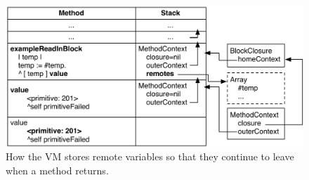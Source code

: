 \documentclass[a4paper,10pt,twoside]{book}
\begin{document}
\begin{figure}
  \begin{center}
    \includegraphics[width=\textwidth]{BlockWithMethodContext}
    \caption{How the VM stores remote variables so that they continue to leave when a method returns.\label{fig:BlockWithMethodContext}}
  \end{center}
\end{figure}








\end{document}
